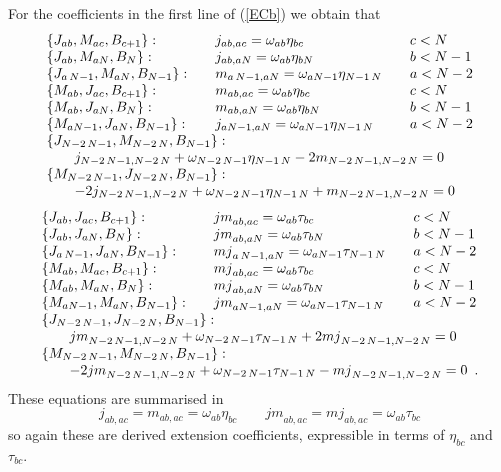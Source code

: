 \documentclass[12pt]{article}
\begin{document}
For the coefficients in the first line of (\ref{ECb}) we obtain that
\begin{equation}
\begin{array}{lll}
\{{J}_{ab},{M}_{ac},{B}_{c+1}\}:
&\quad {j}_{ab,ac}={\omega}_{ab}{\eta}_{bc}&\quad c<N
\cr
\{{J}_{ab},{M}_{aN},{B}_{N}\}:&\quad{j}_{ab,aN}={\omega}_{ab}{\eta}_{bN}&\quad
b<N-1\cr
\{{J}_{a\,N-1},{M}_{aN},{B}_{N-1}\}:
&\quad{m}_{a\,N-1,aN}={\omega}_{aN-1}{\eta}_{N-1\,N}&\quad
a<N-2\cr
 \{{M}_{ab},{J}_{ac},{B}_{c+1}\}:
&\quad{m}_{ab,ac}={\omega}_{ab}{\eta}_{bc}&\quad c<N
\cr
\{{M}_{ab},{J}_{aN},{B}_{N}\}:&\quad{m}_{ab,aN}={\omega}_{ab}{\eta}_{bN}&\quad
b<N-1\cr
\{{M}_{aN-1},{J}_{aN},{B}_{N-1}\}:
&\quad{j}_{aN-1,aN}={\omega}_{aN-1}{\eta}_{N-1\,N}
&\quad a<N-2\cr
\multicolumn{3}{l}
{\{{J}_{N-2\,N-1},{M}_{N-2\,N},{B}_{N-1}\}:}
\cr
\multicolumn{3}{l}
{\qquad {j}_{N-2\,N-1,N-2\,N}+{\omega}_{N-2\,N-1}{\eta}_{N-1\,N}
-2{m}_{N-2\,N-1,N-2\,N}=0}
\cr
\multicolumn{3}{l}{
\{{M}_{N-2\,N-1},{J}_{N-2\,N},{B}_{N-1}\}:}
\cr
\multicolumn{3}{l}{
\qquad -2{j}_{N-2\,N-1,N-2\,N}+{\omega}_{N-2\,N-1}{\eta}_{N-1\,N}
+{m}_{N-2\,N-1,N-2\,N}=0 }
\end{array}
\label{cj}
\end{equation}
\begin{equation}
\begin{array}{lll}
\{{J}_{ab},{J}_{ac},{B}_{c+1}\}:
&\quad {jm}_{ab,ac}={\omega}_{ab}{\tau}_{bc}&\quad c<N
\cr
\{{J}_{ab},{J}_{aN},{B}_{N}\}:&\quad{jm}_{ab,aN}={\omega}_{ab}{\tau}_{bN}&\quad
b<N-1\cr
\{{J}_{a\,N-1},{J}_{aN},{B}_{N-1}\}:
&\quad{mj}_{a\,N-1,aN}={\omega}_{aN-1}{\tau}_{N-1\,N}&\quad
a<N-2\cr
 \{{M}_{ab},{M}_{ac},{B}_{c+1}\}:
&\quad{mj}_{ab,ac}={\omega}_{ab}{\tau}_{bc}&\quad c<N
\cr
\{{M}_{ab},{M}_{aN},{B}_{N}\}:&\quad{mj}_{ab,aN}={\omega}_{ab}{\tau}_{bN}&\quad
b<N-1\cr
\{{M}_{aN-1},{M}_{aN},{B}_{N-1}\}:
&\quad{jm}_{aN-1,aN}={\omega}_{aN-1}{\tau}_{N-1\,N}
&\quad a<N-2\cr
\multicolumn{3}{l}{
\{{J}_{N-2\,N-1},{J}_{N-2\,N},{B}_{N-1}\}:
}
\cr
\multicolumn{3}{l}{
\qquad {jm}_{N-2\,N-1,N-2\,N}+{\omega}_{N-2\,N-1}{\tau}_{N-1\,N}
+2{mj}_{N-2\,N-1,N-2\,N}=0
}
\cr
\multicolumn{3}{l}{
\{{M}_{N-2\,N-1},{M}_{N-2\,N},{B}_{N-1}\}:
}
\cr
\multicolumn{3}{l}{
\qquad -2{jm}_{N-2\,N-1,N-2\,N}+{\omega}_{N-2\,N-1}{\tau}_{N-1\,N}
-{mj}_{N-2\,N-1,N-2\,N}=0}.
\end{array}
\label{ck}
\end{equation}
These equations are summarised in
\begin{equation}
{j}_{ab,ac}={m}_{ab,ac}={\omega}_{ab}{\eta}_{bc}  \qquad
{jm}_{ab,ac}={mj}_{ab,ac}={\omega}_{ab}{\tau}_{bc}
\label{cl}
\end{equation}
so again these are derived extension coefficients, expressible in
terms of ${\eta}_{bc}$ and ${\tau}_{bc}$.
\end{document}
